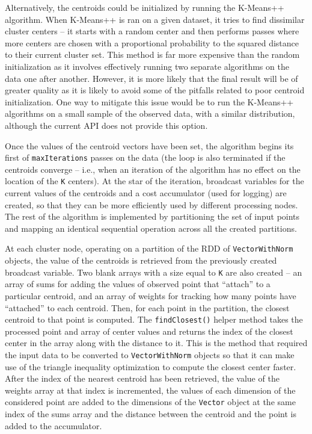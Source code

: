 \documentclass{l4proj}
\begin{document}
Alternatively, the centroids could be initialized by running the K-Means++ algorithm\cite{PlusPlus}. When K-Means++ is ran on a given dataset, it tries to find dissimilar cluster centers -- it starts with a random center and then performs passes where more centers are chosen with a proportional probability to the squared distance to their current cluster set. This method is far more expensive than the random initialization as it involves effectively running two separate algorithms on the data one after another. However, it is more likely that the final result will be of greater quality as it is likely to avoid some of the pitfalls related to poor centroid initialization. One way to mitigate this issue would be to run the K-Means++ algorithms on a small sample of the observed data, with a similar distribution, although the current API does not provide this option.

Once the values of the centroid vectors have been set, the algorithm begins its first of \texttt{maxIterations} passes on the data (the loop is also terminated if the centroids converge -- i.e., when an iteration of the algorithm has no effect on the location of the \texttt{K} centers). At the star of the iteration, broadcast variables for the current values of the centroids and a cost accumulator (used for logging) are created, so that they can be more efficiently used by different processing nodes. The rest of the algorithm is implemented by partitioning the set of input points and mapping an identical sequential operation across all the created partitions. 

At each cluster node, operating on a partition of the RDD of \texttt{VectorWithNorm} objects, the value of the centroids is retrieved from the previously created broadcast variable. Two blank arrays with a size equal to \texttt{K} are also created -- an array of sums for adding the values of observed point that ``attach'' to a particular centroid, and an array of weights for tracking how many points have ``attached'' to each centroid. Then, for each point in the partition, the closest centroid to that point is computed. The \texttt{findClosest()} helper method takes the processed point and array of center values and returns the index of the closest center in the array along with the distance to it. This is the method that required the input data to be converted to \texttt{VectorWithNorm} objects so that it can  make use of the triangle inequality optimization to compute the closest center faster\cite{Triangle}. After the index of the nearest centroid has been retrieved, the value of the weights array at that index is incremented, the values of each dimension of the considered point are added to the dimensions of the \texttt{Vector} object at the same index of the sums array and the distance between the centroid and the point is added to the accumulator.
\end{document}
